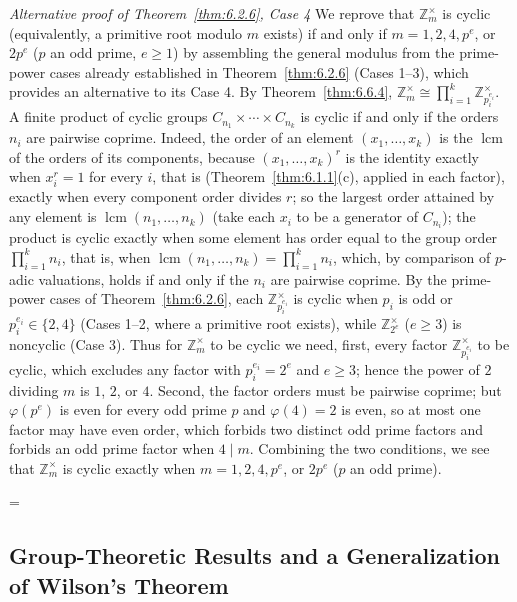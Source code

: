 \documentclass[11pt]{article}
\makeatletter
\theoremstyle{ntstyle}
\let\nt@closedisplay\]
\def\nt@guardedclose{\@ifnextchar\par{\nt@closeafterpar}{\@ifnextchar\end{\postdisplaypenalty\@M\nt@closedisplay}{\nt@closedisplay}}}
\def\nt@closeafterpar\par{\@ifnextchar\par{\nt@closeafterpar}{\@ifnextchar\end{\postdisplaypenalty\@M\nt@closedisplay\par}{\nt@closedisplay\par}}}
\renewenvironment{proof}[1][\proofname]{\par
  \pushQED{\qed}\normalfont\topsep\medskipamount\edef\nt@afterproof{\@endparpenalty=\the\@endparpenalty\relax}\@beginparpenalty\@M\@endparpenalty\@M\let\]\nt@guardedclose\trivlist\item[]\textit{#1\@addpunct{.}} \ignorespaces}{\ifvmode\addpenalty\@M\fi\popQED\nt@afterproof\endtrivlist\@endpefalse}
\newenvironment{altproof}[1][\proofname]{\begin{proof}[#1]\renewcommand{\qedsymbol}{}}{\end{proof}}
\newcommand{\ZmodUnits}[1]{\mathbb{Z}_{#1}^{\times}}
\DeclareMathOperator{\lcm}{lcm}
\makeatother
\begin{document}
\begin{altproof}[Alternative proof of Theorem~\ref{thm:6.2.6}, Case 4] We reprove that
	$\ZmodUnits{m}$ is cyclic (equivalently, a primitive root
	modulo $m$ exists) if and only if $m = 1, 2, 4, p^{e}$, or
	$2 p^{e}$ ($p$ an odd prime, $e \ge 1$) by assembling the general
	modulus from the prime-power cases already established in Theorem~\ref{thm:6.2.6} (Cases 1--3), which provides an alternative to its Case 4. By
	Theorem~\ref{thm:6.6.4}, $\ZmodUnits{m}
		\cong \prod_{i=1}^{k}\ZmodUnits{p_i^{e_i}}$. A finite product of cyclic groups $C_{n_1} \times \cdots \times
		C_{n_k}$ is cyclic if and only if the orders $n_i$ are pairwise
	coprime. Indeed, the order of an element $(x_1, \ldots, x_k)$ is the
	$\lcm$ of the orders of its components, because
	$(x_1,\ldots,x_k)^r$ is the identity exactly when $x_i^r=1$ for every
	$i$, that is (Theorem~\ref{thm:6.1.1}(c), applied in each factor), exactly
	when every component order divides $r$; so the largest
	order attained by any element is $\lcm(n_1, \ldots, n_k)$ (take each $x_i$ to be a generator of $C_{n_i}$); the product is
	cyclic exactly when some element has order equal to the group order
	$\prod_{i=1}^{k}n_i$, that is, when $\lcm(n_1, \ldots, n_k) =
		\prod_{i=1}^{k}n_i$, which, by comparison of $p$-adic valuations, holds if and
	only if the $n_i$ are pairwise coprime. By the prime-power cases of Theorem~\ref{thm:6.2.6}, each
	$\ZmodUnits{p_i^{e_i}}$ is cyclic when $p_i$ is odd or
	$p_i^{e_i} \in \{2, 4\}$ (Cases 1--2, where a primitive root exists),
	while $\ZmodUnits{2^{e}}$ ($e \ge 3$) is noncyclic
	(Case 3). Thus for $\ZmodUnits{m}$ to be cyclic we need,
	first, every factor $\ZmodUnits{p_i^{e_i}}$ to be cyclic,
	which excludes any factor with $p_i^{e_i} = 2^{e}$ and $e \ge 3$; hence
	the power of $2$ dividing $m$ is $1$, $2$, or $4$. Second, the factor
	orders must be pairwise coprime; but $\varphi(p^{e})$ is even for every
	odd prime $p$ and $\varphi(4) = 2$ is even, so at most one factor may
	have even order, which forbids two distinct odd prime factors and
	forbids an odd prime factor when $4 \mid m$. Combining the two
	conditions, we see that $\ZmodUnits{m}$ is cyclic exactly when $m = 1, 2,
		4, p^{e}$, or $2 p^{e}$ ($p$ an odd prime).

\end{altproof}
\subsection{Group-Theoretic Results and a Generalization of Wilson's Theorem}
\end{document}
